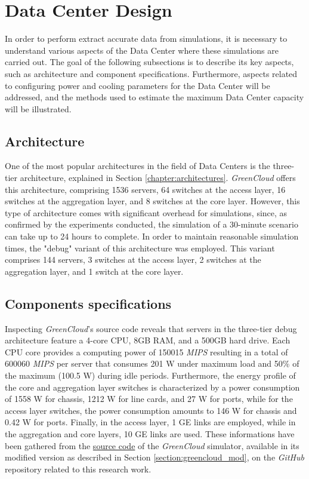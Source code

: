 \section{Data Center Design}
In order to perform extract accurate data from simulations, it is necessary to understand various aspects of the Data Center where these simulations are carried out. The goal of the following subsections is to describe its key aspects, such as architecture and component specifications. Furthermore, aspects related to configuring power and cooling parameters for the Data Center will be addressed, and the methods used to estimate the maximum Data Center capacity will be illustrated.

\subsection{Architecture}
One of the most popular architectures in the field of Data Centers is the three-tier architecture, explained in Section \ref{chapter:architectures}. \emph{GreenCloud} offers this architecture, comprising 1536 servers, 64 switches at the access layer, 16 switches at the aggregation layer, and 8 switches at the core layer. However, this type of architecture comes with significant overhead for simulations, since, as confirmed by the experiments conducted, the simulation of a 30-minute scenario can take up to 24 hours to complete. In order to maintain reasonable simulation times, the "debug" variant of this architecture was employed. This variant comprises 144 servers, 3 switches at the access layer, 2 switches at the aggregation layer, and 1 switch at the core layer. 

\subsection{Components specifications} \label{subsection:components_spec}
Inspecting \emph{GreenCloud}'s source code reveals that servers in the three-tier debug architecture feature a 4-core CPU, 8GB RAM, and a 500GB hard drive. Each CPU core provides a computing power of 150015 \emph{MIPS} resulting in a total of 600060 \emph{MIPS} per server that consumes 201 W under maximum load and 50\% of the maximum (100.5 W) during idle periods. Furthermore, the energy profile of the core and aggregation layer switches is characterized by a power consumption of 1558 W for chassis, 1212 W for line cards, and 27 W for ports, while for the access layer switches, the power consumption amounts to 146 W for chassis and 0.42 W for ports. Finally, in the access layer, 1 GE links are employed, while in the aggregation and core layers, 10 GE links are used. These informations have been gathered from the \href{https://github.com/vincenzo-emanuele/masters-degree-thesis/tree/main/greencloud_modified_src}{source code} of the \emph{GreenCloud} simulator, available in its modified version as described in Section \ref{section:greencloud_mod}, on the \emph{GitHub} repository related to this research work. 

